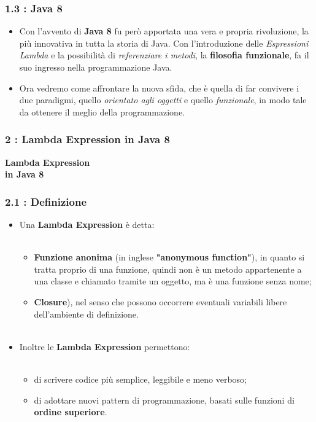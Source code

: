\documentclass{beamer}
\begin{document}

\begin{frame}
	\frametitle{\textbf{1.3 : Java 8}}
	\begin{itemize}
		\item
			Con l'avvento di \textbf{Java 8} fu però apportata una vera e propria rivoluzione, la più innovativa in tutta la storia di Java. Con l'introduzione delle \textit{Espressioni Lambda} e la possibilità di \textit{referenziare i metodi}, la \textbf{filosofia funzionale}, fa il suo ingresso nella programmazione Java.
		\item
			Ora vedremo come affrontare la nuova sfida, che è quella di far convivere i due paradigmi, quello \textit{orientato agli oggetti} e quello \textit{funzionale}, in modo tale da ottenere il meglio della programmazione.				
	\end{itemize}
\end{frame}


\begin{frame}
	\frametitle{\textbf{2 : Lambda Expression in Java 8}}
	\begin{center}
		\textbf{\Huge Lambda Expression\\ in Java 8}
	\end{center}
\end{frame}


\begin{frame}
	\frametitle{\textbf{2.1 : Definizione}}
	\begin{itemize}
			\item
				Una \textbf{Lambda Expression} è detta:\\\
				\begin{itemize}
					\item
						\textbf{Funzione anonima} (in inglese \textbf{"anonymous function"}), in quanto si tratta proprio di una funzione, quindi non è un metodo appartenente a una classe e chiamato tramite un oggetto, ma è una funzione senza nome;
					\item 
						\textbf{Closure}), nel senso che possono occorrere eventuali variabili libere dell'ambiente di definizione.\\\
				\end{itemize}
			\item
				Inoltre le \textbf{Lambda Expression} permettono:\\\
				\begin{itemize}
					\item
						di scrivere codice più semplice, leggibile e meno verboso;
					\item
						di adottare nuovi pattern di programmazione, basati sulle funzioni di \textbf{ordine superiore}.
				\end{itemize}				
	\end{itemize}
\end{frame}
\end{document}
